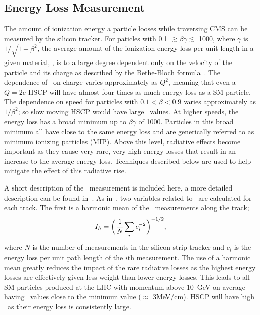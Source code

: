 \subsection{Energy Loss Measurement \label{sec:DedxMeasurement}}
The amount of ionization energy a particle looses while traversing CMS can be measured by the silicon tracker.
For paticles with 0.1 $\gtrsim \beta \gamma \lesssim$ 1000, where $\gamma$ is $1/\sqrt{1 - \beta^2}$,
the average amount of the ionization energy loss per unit length in a given material, \dedx, is to a large degree dependent only on the velocity of the particle
and its charge as described by the Bethe-Bloch formula~\cite{PDG}.
The dependence of \dedx\  on charge varies approximately as $Q^2$, meaning that even a $Q=2e$ HSCP will have almost four times as much energy loss as a SM particle. 
The dependence on speed for particles with $0.1 < \beta < 0.9$ varies approximately as $1/\beta^2$; so slow moving HSCP would have large \dedx\ values.
At higher speeds, the energy loss has a broad minimum up to $\beta \gamma$ of 1000.
Particles in this broad minimum all have close to the same energy loss and are generically referred to as minimum ionizing particles (MIP).
Above this level, radiative effects become important as they cause very rare, very high-energy losses that result in an increase to the average energy loss.
Techniques described below are used to help mitigate the effect of this radiative rise.

A short description of the \dedx\ measurement is included here, a more detailed description can be found in~\cite{2010EPJC...70.1165K, Khachatryan:2011ts, Quertenmont:1361029}.
As in~\cite{Chatrchyan:2012sp}, two variables related to \dedx\ are calculated for each track. 
The first is a harmonic mean of the \dedx\ measurements along the track;
\begin{equation}
 I_h= \biggl( \cfrac{1}{N} \sum_i c_{i}^{-2} \biggr)^{-1/2},
 \label{eq:HarmonicEstimator}
\end{equation}
where $N$ is the number of measurements in the silicon-strip tracker and $c_{i}$ is the energy loss per unit path length
of the $i$th measurement. The use of a harmonic mean greatly reduces the impact of the rare radiative losses as the highest energy
losses are effectively given less weight than lower energy losses. This leads to all
SM particles produced at the LHC with momentum above 10~GeV on average having \ih\ values close to the minimum value ($\approx$ 3MeV/cm). 
HSCP will have high \ih\ as their energy loss is consistently large.

